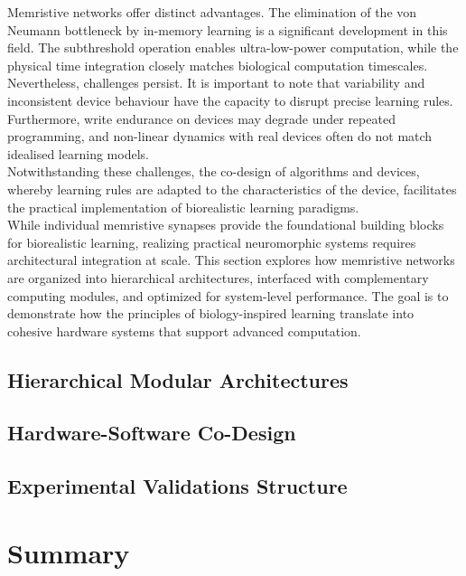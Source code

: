 \noindent Memristive networks offer distinct advantages. The elimination of the von Neumann bottleneck by in-memory learning is a significant development in this field. The subthreshold operation enables ultra-low-power computation, while the physical time integration closely matches biological computation timescales. \\

\noindent Nevertheless, challenges persist. It is important to note that variability and inconsistent device behaviour have the capacity to disrupt precise learning rules. Furthermore, write endurance on devices may degrade under repeated programming, and non-linear dynamics with real devices often do not match idealised learning models.\\

\noindent Notwithstanding these challenges, the co-design of algorithms and devices, whereby learning rules are adapted to the characteristics of the device, facilitates the practical implementation of biorealistic learning paradigms.\\

\noindent While individual memristive synapses provide the foundational building blocks for biorealistic learning, realizing practical neuromorphic systems requires architectural integration at scale. This section explores how memristive networks are organized into hierarchical architectures, interfaced with complementary computing modules, and optimized for system-level performance. The goal is to demonstrate how the principles of biology-inspired learning translate into cohesive hardware systems that support advanced computation.

\subsection[Hierarchical Modular Architectures]{Hierarchical Modular Architectures}

\subsection[Hardware-Software Co-Design]{Hardware-Software Co-Design}

\subsection[Experimental Validations Structure]{Experimental Validations Structure}

\section[Summary]{Summary}